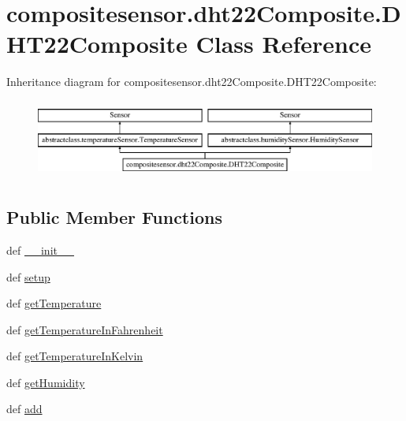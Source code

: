 \hypertarget{classcompositesensor_1_1dht22Composite_1_1DHT22Composite}{}\section{compositesensor.\+dht22\+Composite.\+D\+H\+T22\+Composite Class Reference}
\label{classcompositesensor_1_1dht22Composite_1_1DHT22Composite}
Inheritance diagram for compositesensor.\+dht22\+Composite.\+D\+H\+T22\+Composite\+:\begin{figure}[H]
\begin{center}
\leavevmode
\includegraphics[height=2.625000cm]{classcompositesensor_1_1dht22Composite_1_1DHT22Composite}
\end{center}
\end{figure}
\subsection*{Public Member Functions}
\begin{DoxyCompactItemize}
\item 
def \hyperlink{classcompositesensor_1_1dht22Composite_1_1DHT22Composite_a6cb6e09728acc436e5cc85635276cab6}{\+\_\+\+\_\+init\+\_\+\+\_\+}
\item 
def \hyperlink{classcompositesensor_1_1dht22Composite_1_1DHT22Composite_a919c2858900ba9c247065aed4d733281}{setup}
\item 
def \hyperlink{classcompositesensor_1_1dht22Composite_1_1DHT22Composite_a277e8a94c3de6e6e4448b5b4e2e4b650}{get\+Temperature}
\item 
def \hyperlink{classcompositesensor_1_1dht22Composite_1_1DHT22Composite_a29e52a696c245216abb19af64e1a7054}{get\+Temperature\+In\+Fahrenheit}
\item 
def \hyperlink{classcompositesensor_1_1dht22Composite_1_1DHT22Composite_a0b126050d0f9fb73b1695eaa11f848a3}{get\+Temperature\+In\+Kelvin}
\item 
def \hyperlink{classcompositesensor_1_1dht22Composite_1_1DHT22Composite_af7a639b951c5ba809b0333b512a43f41}{get\+Humidity}
\item 
def \hyperlink{classcompositesensor_1_1dht22Composite_1_1DHT22Composite_ab28ad98e066ee6b3e6397048727cdef5}{add}
\end{DoxyCompactItemize}
